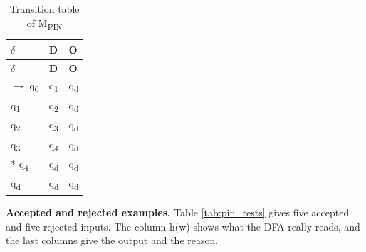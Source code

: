 \documentclass[12pt,a4paper]{article}
\begin{document}
{\small
\begin{longtable}{|>{\raggedright\arraybackslash}p{}|>{\centering\arraybackslash}p{}|>{\centering\arraybackslash}p{}|}
\caption[Transition table of MPIN]{Transition table of M\textsubscript{PIN}}\label{tab:pin_delta}\\
\hline
\rowcolor{hdr}\textbf{\ensuremath{\delta}} & \textbf{D} & \textbf{O}\\ \hline
\endfirsthead
\hline
\rowcolor{hdr}\textbf{\ensuremath{\delta}} & \textbf{D} & \textbf{O}\\ \hline
\endhead
\ensuremath{\rightarrow} q\textsubscript{0} & q\textsubscript{1} & q\textsubscript{d}\\ \hline
q\textsubscript{1} & q\textsubscript{2} & q\textsubscript{d}\\ \hline
q\textsubscript{2} & q\textsubscript{3} & q\textsubscript{d}\\ \hline
q\textsubscript{3} & q\textsubscript{4} & q\textsubscript{d}\\ \hline
* q\textsubscript{4} & q\textsubscript{d} & q\textsubscript{d}\\ \hline
q\textsubscript{d} & q\textsubscript{d} & q\textsubscript{d}\\ \hline
\end{longtable}}

\textbf{Accepted and rejected examples.} Table \ref{tab:pin_tests} gives five accepted and five rejected inputs. The column h(w) shows what the DFA really reads, and the last columns give the output and the reason.
\end{document}
